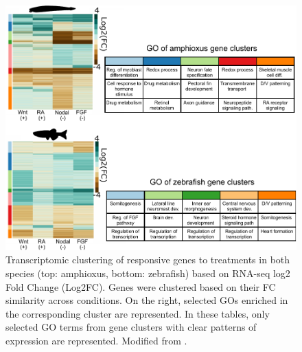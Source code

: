 \begin{figure}[hp]
\centering
\includegraphics[width=1\textwidth]{Figures/RNA_seq_clustering_v2}
\caption[Transcriptomic clustering of the responsive genes to treatments in both species]{Transcriptomic clustering of responsive genes to treatments in both species (top: amphioxus, bottom: zebrafish) based on RNA-seq log2 Fold Change (Log2FC). Genes were clustered based on their FC similarity across conditions. On the right, selected GOs enriched in the corresponding cluster are represented. In these tables, only selected GO terms from gene clusters with clear patterns of expression are represented. Modified from \parencite{gil-galvez_gain_2022}.
}
\label{fig:RNAseq_clustering}
\end{figure} 

